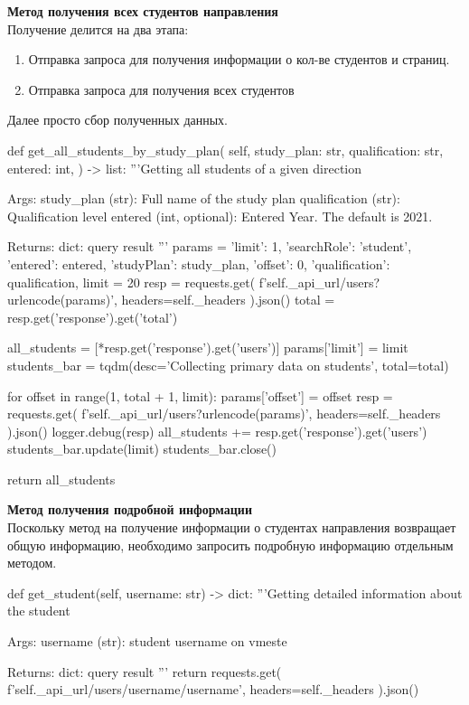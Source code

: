 \documentclass[a4paper,12pt]{article} %
\begin{document}
\textbf{Метод получения всех студентов направления} \\
Получение делится на два этапа:
\begin{enumerate}
    \item Отправка запроса для получения информации о кол-ве студентов и страниц.
    \item Отправка запроса для получения всех студентов 
\end{enumerate}
Далее просто сбор полученных данных.
\begin{python}
    def get_all_students_by_study_plan(
        self,
        study_plan: str,
        qualification: str,
        entered: int,
    ) -> list:
        '''Getting all students of a given direction

        Args:
            study_plan (str): Full name of the study plan
            qualification (str): Qualification level
            entered (int, optional): Entered Year. The default is 2021.

        Returns:
            dict: query result
        '''
        params = {
            'limit': 1,
            'searchRole': 'student',
            'entered': entered,
            'studyPlan': study_plan,
            'offset': 0,
            'qualification': qualification,
        }
        limit = 20
        resp = requests.get(
            f'{self._api_url}/users?{urlencode(params)}', headers=self._headers
        ).json()
        total = resp.get('response').get('total')

        all_students = [*resp.get('response').get('users')]
        params['limit'] = limit
        students_bar = tqdm(desc='Collecting primary data on students', total=total)

        for offset in range(1, total + 1, limit):
            params['offset'] = offset
            resp = requests.get(
                f'{self._api_url}/users?{urlencode(params)}', headers=self._headers
            ).json()
            logger.debug(resp)
            all_students += resp.get('response').get('users')
            students_bar.update(limit)
        students_bar.close()

        return all_students
\end{python}

\textbf{Метод получения подробной информации} \\
Поскольку метод на получение информации о студентах направления возвращает общую информацию, необходимо запросить подробную информацию отдельным методом.
\begin{python}
    def get_student(self, username: str) -> dict:
        '''Getting detailed information about the student

        Args:
            username (str): student username on vmeste

        Returns:
            dict: query result
        '''
        return requests.get(
            f'{self._api_url}/users/username/{username}', headers=self._headers
        ).json()
\end{python}
\end{document}

